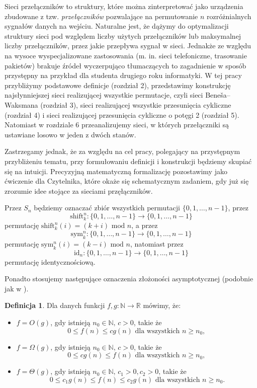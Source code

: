 \documentclass[a4paper]{article}
\renewcommand{\mod}{\,\, \text{mod} \,\,}
\newcommand{\shift}[2]{\text{shift}_{#2}^{#1}}
\newcommand{\sym}[2]{\text{sym}_{#2}^{#1}}
\newcommand{\id}[1]{\text{id}_{#1}}
\newcommand{\td}{\text{.}}
\newcommand{\tc}{\text{, }}
\newcommand{\N}{\mathbb{N}}
\newcommand{\R}{\mathbb{R}}
\theoremstyle{definition}
\newtheorem{df}[tw]{Definicja}
\begin{document}
Sieci przełączników to struktury, które można zinterpretować jako urządzenia zbudowane z tzw. \textit{przełączników} pozwalające na permutowanie \(n\) rozróżnialnych sygnałów danych na wejściu. Naturalne jest, że dążymy do optymalizacji struktury sieci pod względem liczby użytych przełączników lub maksymalnej liczby przełączników, przez jakie przepływa sygnał w sieci. Jednakże ze względu na wysoce wyspecjalizowane zastosowania (m. in. sieci telefoniczne, trasowanie pakietów) brakuje źródeł wyczerpująco tłumaczących to zagadnienie w sposób przystępny na przykład dla studenta drugiego roku informatyki. W tej pracy przybliżymy podstawowe definicje (rozdział 2), przedstawimy konstrukcję najsłynniejszej sieci realizującej wszystkie permutacje, czyli sieci Beneša--Waksmana (rozdział 3), sieci realizującej wszystkie przesunięcia cykliczne (rozdział 4) i sieci realizującej przesunięcia cykliczne o potęgi 2 (rozdział 5).  Natomiast w rozdziale 6 przeanalizujemy sieci, w których przełączniki są ustawiane losowo w jeden z dwóch stanów. 

\vspace{1em}

Zastrzegamy jednak, że za względu na cel pracy, polegający na przystępnym przybliżeniu tematu, przy formułowaniu definicji i konstrukcji będziemy skupiać się na intuicji. Precyzyjną matematyczną formalizację pozostawimy jako ćwiczenie dla Czytelnika, które okaże się schematycznym zadaniem, gdy już się zrozumie idee stojące za sieciami przęłączników. 

\vspace{1em}

Przez \(S_n\) będziemy oznaczać zbiór wszystkich permutacji \(\{0, 1, \ldots, n-1\}\), przez
\[
\shift{n}{k} : \{0, 1, \ldots, n-1\} \to \{0, 1, \ldots, n-1\} 
\]
permutację \(\shift{n}{k}(i) = (k+i) \mod n\), a przez
\[
\sym{n}{k} : \{0, 1, \ldots, n-1\} \to \{0, 1, \ldots, n-1\} 
\]
permutację \(\sym{n}{k}(i) = (k-i) \mod n\), natomiast przez 
\[
\id{n} : \{0, 1, \ldots, n-1\} \to \{0, 1, \ldots, n-1\} 
\]
permutację identycznościową. 

\vspace{1em}

Ponadto stosujemy następujące oznaczenia złożoności asymptotycznej (podobnie jak w \cite{cormen}).

\begin{df}
    Dla danych funkcji \(f, g : \N \to \R\) mówimy, że:
    \begin{itemize}
        \item \(f = O(g)\), gdy istnieją \( n_0 \in \N, \,  c > 0\), takie że 
        \[
            0 \leq f(n) \leq cg(n)  \text{ dla wszystkich } n \geq n_0 \tc
        \]
        \item \(f = \Omega(g)\), gdy istnieją \( n_0 \in \N, \,  c > 0\), takie że 
        \[
            0 \leq cg(n) \leq f(n)  \text{ dla wszystkich } n \geq n_0 \tc
        \]
        \item  \(f = \Theta(g)\), gdy istnieją \( n_0 \in \N, \,  c_1 > 0, c_2 > 0\), takie że 
        \[
            0 \leq c_1 g(n) \leq f(n) \leq c_2 g(n)  \text{ dla wszystkich } n \geq n_0 \td
        \]
    \end{itemize}
\end{df}
\end{document}
